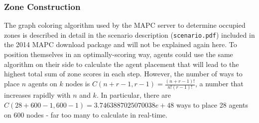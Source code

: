 \subsubsection{Zone Construction}\label{alg:zon_construction}
The graph coloring algorithm used by the MAPC server to determine occupied zones is described in detail in the scenario description (\texttt{scenario.pdf}) included in the 2014 MAPC download package and will not be explained again here. To position themselves in an optimally-scoring way, agents could use the same algorithm on their side to calculate the agent placement that will lead to the highest total sum of zone scores in each step. However, the number of ways to place $n$ agents on $k$ nodes is $C \left (n+r-1,r-1\right )= \frac{\left(n+r-1 \right )!}{n!\left(r-1 \right )!}$, a number that increases rapidly with $n$ and $k$. In particular, there are $C \left (28+600-1,600-1 \right ) = 3.7463887025070038e+48$ ways to place 28 agents on 600 nodes - far too many to calculate in real-time.

\iffalse %
Due to the way the server-side colouring algorithm works, placing $N$ agents on the map so that they establish the highest possible zone value per step is anything but straight-forward. Even for $n = 1$, a single agent placed on an articulation point in the graph can establish a high-value zone if there are no enemy agents in either subgraph that it splits the map into. \autoref{fig:articulation_points} shows an example.
\begin{figure}
  \centering
  \texttt{[image: articulation\_points]}
  \caption{The control loop for the agent deliberation process in the BOID architecture. Taken from \citeauthor{broersen2002goal}~\cite{broersen2002goal}.}
  \label{fig:control}
\end{figure}
In some way, we try to find local maxima to build small zones with as few agents as possible. How do we find zones? How do we find out how many agents we need? Explain that extending zones describes how the score resulting from an active zone can be increased by using idle agents. How do we determine what additional spots for zone extensions exist?
Present our colouring algorithm and the concept of a centre node.
\fi